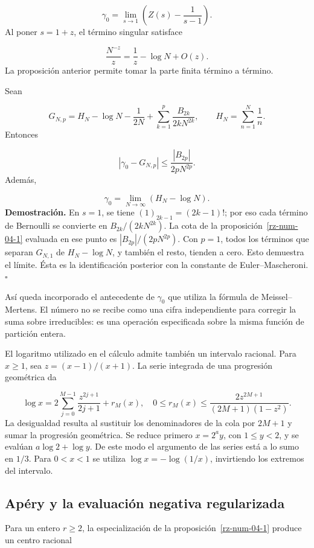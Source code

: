 \[
\gamma_0=\lim_{s\to1}\left(Z(s)-\frac1{s-1}\right).
\]
Al poner \(s=1+z\), el término singular satisface

\[
\frac{N^{-z}}z=\frac1z-\log N+O(z).
\]
La proposición anterior permite tomar la parte finita término a término.

Sean

\[
G_{N,p}=H_N-\log N-\frac1{2N}
+\sum_{k=1}^p\frac{B_{2k}}{2kN^{2k}},
\qquad H_N=\sum_{n=1}^N\frac1n.
\]
Entonces

\[
|\gamma_0-G_{N,p}|\leq\frac{|B_{2p}|}{2pN^{2p}}.
\]
Además,

\[
\gamma_0=\lim_{N\to\infty}(H_N-\log N).
\]
\textbf{Demostración.} En \(s=1\), se tiene \((1)_{2k-1}=(2k-1)!\); por eso cada término de Bernoulli se convierte en \(B_{2k}/(2kN^{2k})\). La cota de la proposición~\ref{rz-num-04-1} evaluada en ese punto es \(|B_{2p}|/(2pN^{2p})\). Con \(p=1\), todos los términos que separan \(G_{N,1}\) de \(H_N-\log N\), y también el resto, tienden a cero. Esto demuestra el límite. Ésta es la identificación posterior con la constante de Euler–Mascheroni. \hfill\(\square\)

Así queda incorporado el antecedente de \(\gamma_0\) que utiliza la fórmula de Meissel–Mertens. El número no se recibe como una cifra independiente para corregir la suma sobre irreducibles: es una operación especificada sobre la misma función de partición entera.

El logaritmo utilizado en el cálculo admite también un intervalo racional. Para \(x\geq1\), sea \(z=(x-1)/(x+1)\). La serie integrada de una progresión geométrica da

\[
\log x=2\sum_{j=0}^{M-1}\frac{z^{2j+1}}{2j+1}+r_M(x),
\quad
0\leq r_M(x)\leq
\frac{2z^{2M+1}}{(2M+1)(1-z^2)}.
\]
La desigualdad resulta al sustituir los denominadores de la cola por \(2M+1\) y sumar la progresión geométrica. Se reduce primero \(x=2^a y\), con \(1\leq y<2\), y se evalúan \(a\log2+\log y\). De este modo el argumento de las series está a lo sumo en \(1/3\). Para \(0<x<1\) se utiliza \(\log x=-\log(1/x)\), invirtiendo los extremos del intervalo.

\subsection{Apéry y la evaluación negativa regularizada}
Para un entero \(r\geq2\), la especialización de la proposición~\ref{rz-num-04-1} produce un centro racional


